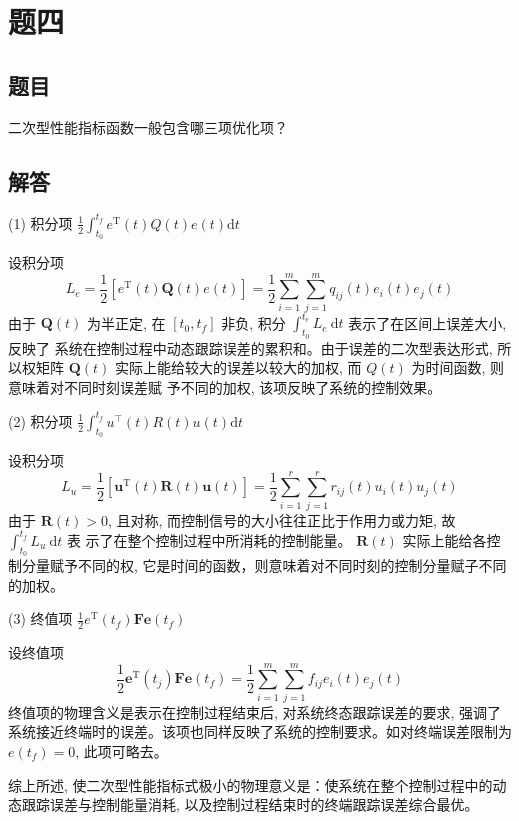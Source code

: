 \documentclass[UTF8]{ctexart}
\begin{document}
\section{题四}

  \subsection{题目}
  二次型性能指标函数一般包含哪三项优化项？
  \subsection{解答}
  \par (1) 积分项 $\frac{1}{2} \int_{t_{0}}^{t_{f}} e^{\mathrm{T}}(t) Q(t) e(t) \mathrm{d} t$
  
  设积分项
  $$
  L_{e}=\frac{1}{2}\left[e^{\mathrm{T}}(t) \boldsymbol{Q}(t) e(t)\right]=\frac{1}{2} \sum_{i=1}^{m} \sum_{j=1}^{m} q_{i j}(t) e_{i}(t) e_{j}(t)
  $$
  由于 $\boldsymbol{Q}(t)$ 为半正定, 在 $\left[t_{0}, t_{f}\right]$ 非负, 积分 $\int_{t_{0}}^{t_{e}} L_{e} \mathrm{~d} t$ 表示了在区间上误差大小, 反映了 系统在控制过程中动态跟踪误差的累积和。由于误差的二次型表达形式, 所以权矩阵 $\boldsymbol{Q}(t)$ 实际上能给较大的误差以较大的加权, 而 $Q(t)$ 为时间函数, 则意味着对不同时刻误差赋 予不同的加权, 该项反映了系统的控制效果。
  \par (2) 积分项 $\frac{1}{2} \int_{t_{0}}^{t_{f}} u^{\top}(t) R(t) u(t) \mathrm{d} t$
  
  设积分项
  $$
  L_{u}=\frac{1}{2}\left[\boldsymbol{u}^{\mathrm{T}}(t) \boldsymbol{R}(t) \boldsymbol{u}(t)\right]=\frac{1}{2} \sum_{i=1}^{r} \sum_{j=1}^{r} r_{i j}(t) u_{i}(t) u_{j}(t)
  $$
  由于 $\boldsymbol{R}(t)>0$, 且对称, 而控制信号的大小往往正比于作用力或力矩, 故 $\int_{t_{0}}^{t_{f}} L_{u} \mathrm{~d} t$ 表 示了在整个控制过程中所消耗的控制能量。 $\boldsymbol{R}(t)$ 实际上能给各控制分量赋予不同的权, 它是时间的函数，则意味着对不同时刻的控制分量赋子不同的加权。
  \par (3) 终值项 $\frac{1}{2} e^{\mathrm{T}}\left(t_{f}\right) \boldsymbol{F e}\left(t_{f}\right)$
  
  设终值项
  $$
  \frac{1}{2} \boldsymbol{e}^{\mathrm{T}}\left(t_{j}\right) \boldsymbol{F e}\left(t_{f}\right)=\frac{1}{2} \sum_{i=1}^{m} \sum_{j=1}^{m} f_{i j} e_{i}(t) e_{j}(t)
  $$
  终值项的物理含义是表示在控制过程结束后, 对系统终态跟踪误差的要求, 强调了 系统接近终端时的误差。该项也同样反映了系统的控制要求。如对终端误差限制为 $e\left(t_{f}\right)=0$, 此项可略去。
  
  综上所述, 使二次型性能指标式极小的物理意义是：使系统在整个控制过程中的动态跟踪误差与控制能量消耗, 以及控制过程结束时的终端跟踪误差综合最优。
\end{document}
